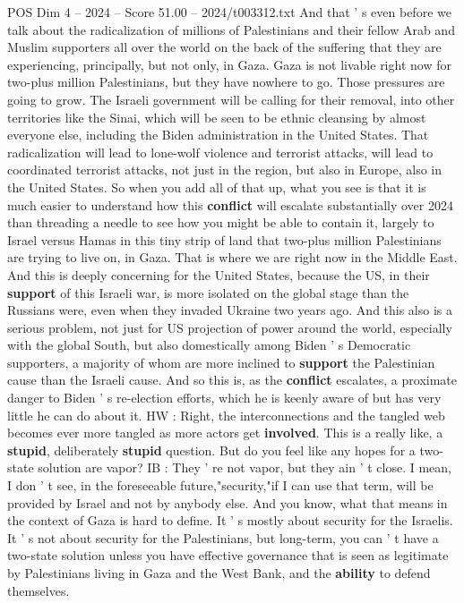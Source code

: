 \begin{textsample}{POS Dim 4 – 2024 – Score 51.00 – 2024/t003312.txt}
And that ' s even before we talk about the radicalization of millions of Palestinians and their fellow Arab and Muslim supporters all over the world on the back of the suffering that they are experiencing, principally, but not only, in Gaza.
Gaza is not livable right now for two-plus million Palestinians, but they have nowhere to go.
Those pressures are going to grow.
The Israeli government will be calling for their removal, into other territories like the Sinai, which will be seen to be ethnic cleansing by almost everyone else, including the Biden administration in the United States.
That radicalization will lead to lone-wolf violence and terrorist attacks, will lead to coordinated terrorist attacks, not just in the region, but also in Europe, also in the United States.
So when you add all of that up, what you see is that it is much easier to understand how this \textbf{conflict} will escalate substantially over 2024 than threading a needle to see how you might be able to contain it, largely to Israel versus Hamas in this tiny strip of land that two-plus million Palestinians are trying to live on, in Gaza.
That is where we are right now in the Middle East.
And this is deeply concerning for the United States, because the US, in their \textbf{support} of this Israeli war, is more isolated on the global stage than the Russians were, even when they invaded Ukraine two years ago.
And this also is a serious problem, not just for US projection of power around the world, especially with the global South, but also domestically among Biden ' s Democratic supporters, a majority of whom are more inclined to \textbf{support} the Palestinian cause than the Israeli cause.
And so this is, as the \textbf{conflict} escalates, a proximate danger to Biden ' s re-election efforts, which he is keenly aware of but has very little he can do about it.
HW : Right, the interconnections and the tangled web becomes ever more tangled as more actors get \textbf{involved}.
This is a really like, a \textbf{stupid}, deliberately \textbf{stupid} question.
But do you feel like any hopes for a two-state solution are vapor?
IB : They ' re not vapor, but they ain ' t close.
I mean, I don ' t see, in the foreseeable future,"security,"if I can use that term, will be provided by Israel and not by anybody else.
And you know, what that means in the context of Gaza is hard to define.
It ' s mostly about security for the Israelis.
It ' s not about security for the Palestinians, but long-term, you can ' t have a two-state solution unless you have effective governance that is seen as legitimate by Palestinians living in Gaza and the West Bank, and the \textbf{ability} to defend themselves.

\end{textsample}
